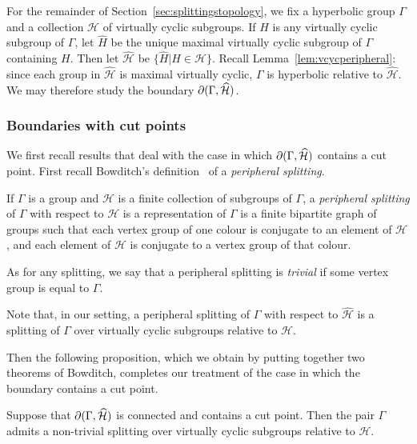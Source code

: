 For the remainder of Section~\ref{sec:splittingstopology}, we fix a hyperbolic
group $\Gamma$ and a collection $\mathcal{H}$ of virtually cyclic subgroups. If
$H$ is any virtually cyclic subgroup of $\Gamma$, let $\widehat{H}$ be the unique
maximal virtually cyclic subgroup of $\Gamma$ containing $H$. Then let
$\widehat{\mathcal{H}}$ be $\{\widehat{H} \vert H \in \mathcal{H}\}$. Recall
Lemma~\ref{lem:vcycperipheral}: since each group in $\widehat{\mathcal{H}}$ is
maximal virtually cyclic, $\Gamma$ is hyperbolic relative to
$\widehat{\mathcal{H}}$. We may therefore study the boundary $\partial(\Gamma,
\widehat{\mathcal{H}})$.

\subsubsection{Boundaries with cut points}

We first recall results that deal with the case in which $\partial(\Gamma,
\widehat{\mathcal{H}})$ contains a cut point. First recall
Bowditch's definition~\cite{bowditch01} of a \emph{peripheral splitting}.

\begin{defn} If $\Gamma$ is a group and $\mathcal{H}$ is a finite collection of
subgroups of $\Gamma$, a \emph{peripheral splitting} of $\Gamma$ with respect
to $\mathcal{H}$ is a representation of $\Gamma$ is a finite bipartite graph of
groups such that each vertex group of one colour is conjugate to an element of
$\mathcal{H}$, and each element of $\mathcal{H}$ is conjugate to a vertex group
of that colour.

As for any splitting, we say that a peripheral splitting is \emph{trivial} if
some vertex group is equal to $\Gamma$.\end{defn}

Note that, in our setting, a peripheral splitting of $\Gamma$ with respect to
$\widehat{\mathcal{H}}$ is a splitting of $\Gamma$ over virtually cyclic subgroups
relative to $\mathcal{H}$.

Then the following proposition, which we obtain by putting together two
theorems of Bowditch, completes our treatment of the case in which the boundary
contains a cut point.

\begin{prop}\label{prop:cutpointimpliessplitting} Suppose that
  $\partial(\Gamma, \widehat{\mathcal{H}})$ is connected and contains a cut point.
Then the pair $\Gamma$ admits a non-trivial splitting over virtually cyclic
subgroups relative to $\mathcal{H}$.
\end{prop}

